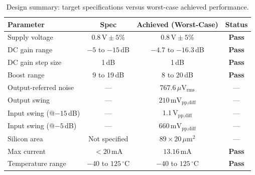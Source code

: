 \begin{table}[H]
    \centering
    \caption{Design summary: target specifications versus worst-case achieved performance.}
    \label{tab:summary}
    \begin{tabular}{lccc}
        \toprule
        \textbf{Parameter}         & \textbf{Spec}           & \textbf{Achieved (Worst-Case)} & \textbf{Status}         \\
        \midrule
        Supply voltage             & $0.8\,\text{V} \pm 5\%$ & $0.8\,\text{V} \pm 5\%$   & \textcolor{green!60!black}{\textbf{Pass}} \\
        DC gain range              & $-5$ to $-15$\,dB       & $-4.7$ to $-16.3$\,dB           & \textcolor{green!60!black}{\textbf{Pass}} \\
        DC gain step size          & 1\,dB                   & 1\,dB                      & \textcolor{green!60!black}{\textbf{Pass}} \\
        Boost range                & 9 to 19\,dB             & 8 to 20\,dB               & \textcolor{green!60!black}{\textbf{Pass}} \\
        Output-referred noise      & ---                     & $767.6\,\mu\text{V}_{\text{rms}}$ & --- \\
        Output swing               & ---                     & $210\,\text{mV}_{\text{pp,diff}}$       & --- \\
        Input swing (@$-15$\,dB)   & ---                     & $1.1\,\text{V}_{\text{pp,diff}}$        & --- \\
        Input swing (@$-5$\,dB)    & ---                     & $660\,\text{mV}_{\text{pp,diff}}$       & --- \\
        Silicon area               & Not specified           & $89\times 20\,\mu\text{m}^2$ & --- \\
        Max current                & $<20$\,mA               & $13.16\,\text{mA}$             & \textcolor{green!60!black}{\textbf{Pass}} \\
        Temperature range          & $-40$ to $125\,^{\circ}$C & $-40$ to $125\,^{\circ}$C & \textcolor{green!60!black}{\textbf{Pass}} \\
        \bottomrule
    \end{tabular}
\end{table}
